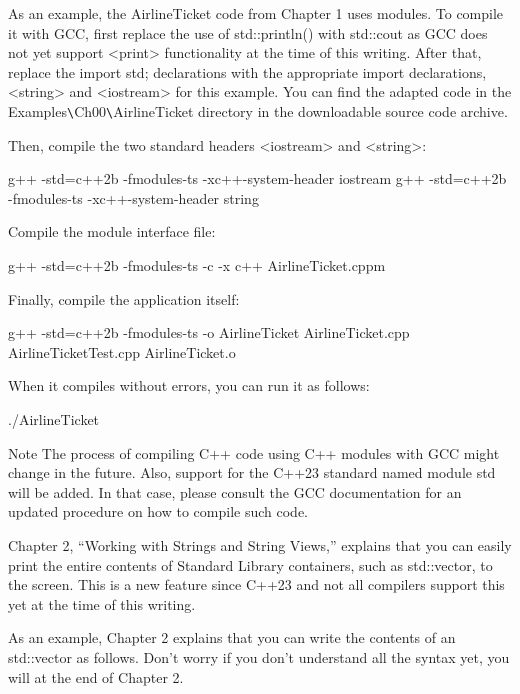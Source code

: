 As an example, the AirlineTicket code from Chapter 1 uses modules. To compile it with GCC, first replace the use of std::println() with std::cout as GCC does not yet support <print> functionality at the time of this writing. After that, replace the import std; declarations with the appropriate import declarations, <string> and <iostream> for this example. You can find the adapted code in the Examples\verb|\|Ch00\verb|\|AirlineTicket directory in the downloadable source code archive.

Then, compile the two standard headers <iostream> and <string>:

\begin{shell}
g++ -std=c++2b -fmodules-ts -xc++-system-header iostream
g++ -std=c++2b -fmodules-ts -xc++-system-header string
\end{shell}

Compile the module interface file:

\begin{shell}
g++ -std=c++2b -fmodules-ts -c -x c++ AirlineTicket.cppm
\end{shell}

Finally, compile the application itself:

\begin{shell}
g++ -std=c++2b -fmodules-ts -o AirlineTicket AirlineTicket.cpp AirlineTicketTest.cpp AirlineTicket.o
\end{shell}

When it compiles without errors, you can run it as follows:

\begin{shell}
./AirlineTicket
\end{shell}

\begin{myNotic}{Note}
The process of compiling C++ code using C++ modules with GCC might change in the future. Also, support for the C++23 standard named module std will be added. In that case, please consult the GCC documentation for an updated procedure on how to compile such code.
\end{myNotic}


Chapter 2, “Working with Strings and String Views,” explains that you can easily print the entire contents of Standard Library containers, such as std::vector, to the screen. This is a new feature since C++23 and not all compilers support this yet at the time of this writing.

As an example, Chapter 2 explains that you can write the contents of an std::vector as follows.
Don’t worry if you don’t understand all the syntax yet, you will at the end of Chapter 2.

